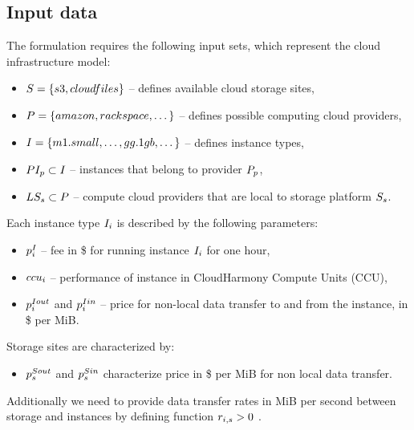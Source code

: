 {\subsection{Input data}
 
  The formulation requires the following input sets, which represent the cloud infrastructure model:
  \begin{itemize}
      \item $S = \{s3, cloudfiles\}$ -- defines available cloud storage
      sites,
      \item $P = \{amazon, rackspace, \dotsc\}$ -- defines
      possible computing cloud providers,
      \item $I = \{m1.small, \dots, gg.1gb, \dotsc\}$ -- defines
      instance types,
      \item $PI_{p} \subset I$ -- instances that
      belong to provider $P_p$,
      \item $LS_{s} \subset P$ -- compute cloud providers
      that are local to storage platform $S_s$.
  \end{itemize}        
    
  Each instance type $I_i$ is described by the following parameters:
  \begin{itemize}
      \item $p^I_i$ -- fee in \$ for running instance $I_i$
      for one hour,
      \item $ccu_i$ -- performance of instance in CloudHarmony Compute Units
      (CCU),
      \item $p^{Iout}_i$ and $p^{Iin}_i$ --
      price for non-local data transfer to and from the instance, in \$ per
      MiB.
  \end{itemize}

  Storage sites are characterized by:
  \begin{itemize}
      \item $p^{Sout}_s$ and $p^{Sin}_s$
      characterize price in \$ per MiB for non local data transfer.
  \end{itemize}

  Additionally we need to provide data transfer rates in MiB per second between storage and instances by defining function $r_{i,s} > 0$ .

}
